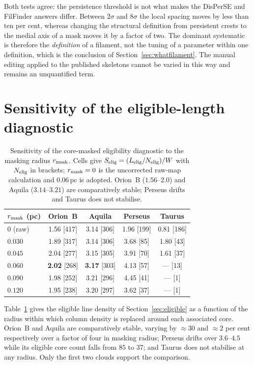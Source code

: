 \documentclass[usenatbib,twoside,twocolumn]{mnras}
\begin{document}
\smallskip\noindent Both tests agree: the persistence threshold is not what makes the DisPerSE and FilFinder answers differ. Between $2\sigma$ and $8\sigma$ the local spacing moves by less than ten per cent, whereas changing the structural definition from persistent crests to the medial axis of a mask moves it by a factor of two. The dominant systematic is therefore the \emph{definition} of a filament, not the tuning of a parameter within one definition, which is the conclusion of Section~\ref{sec:whatfilament}. The manual editing applied to the published skeletons cannot be varied in this way and remains an unquantified term.




\section{Sensitivity of the eligible-length diagnostic}
\label{sec:maskapp}

\begin{table}
\caption{Sensitivity of the core-masked eligibility diagnostic to the masking radius $r_{\rm mask}$. Cells give $S_{\rm elig}=(L_{\rm elig}/N_{\rm elig})/W$ with $N_{\rm elig}$ in brackets; $r_{\rm mask}=0$ is the uncorrected raw-map calculation and $0.06$\,pc is adopted. Orion~B ($1.56$--$2.0$) and Aquila ($3.14$--$3.21$) are comparatively stable; Perseus drifts and Taurus does not stabilise.}
\label{tab:maskrad}
\footnotesize
\setlength{\tabcolsep}{4pt}
\begin{tabular}{lcccc}
\toprule
$r_{\rm mask}$ (pc) & Orion~B & Aquila & Perseus & Taurus \\
\midrule
$0$ (raw) & 1.56 [417] & 3.14 [306] & 1.96 [199] & 0.81 [186] \\
$0.030$   & 1.89 [317] & 3.14 [306] & 3.68 [85]  & 1.80 [43] \\
$0.045$   & 2.04 [277] & 3.15 [305] & 3.91 [70]  & 1.61 [37] \\
$0.060$   & \textbf{2.02} [268] & \textbf{3.17} [303] & 4.13 [57] & --- [13] \\
$0.090$   & 1.98 [252] & 3.21 [296] & 4.45 [41]  & --- [1] \\
$0.120$   & 1.95 [238] & 3.20 [297] & 3.62 [37]  & --- [1] \\
\bottomrule
\end{tabular}
\end{table}

Table~\ref{tab:maskrad} gives the eligible line density of Section~\ref{sec:eligible} as a function of the radius within which column density is replaced around each associated core. Orion~B and Aquila are comparatively stable, varying by $\approx30$ and $\approx2$ per cent respectively over a factor of four in masking radius; Perseus drifts over $3.6$--$4.5$ while its eligible core count falls from $85$ to $37$; and Taurus does not stabilise at any radius. Only the first two clouds support the comparison.
\end{document}
